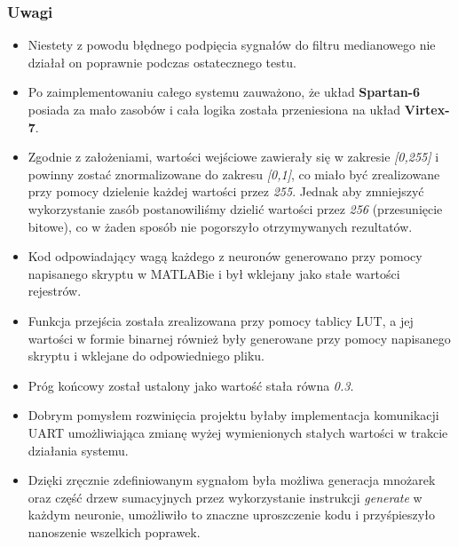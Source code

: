 \subsubsection{Uwagi} 
\begin{itemize}

\item Niestety z powodu błędnego podpięcia sygnałów do filtru medianowego nie działał on poprawnie podczas ostatecznego testu.
\item Po zaimplementowaniu całego systemu zauważono, że układ \textbf{Spartan-6} posiada za mało zasobów i cała logika została przeniesiona na układ \textbf{Virtex-7}.
\item Zgodnie z założeniami, wartości wejściowe zawierały się w zakresie \textit{[0,255]} i powinny zostać znormalizowane do zakresu\textit{ [0,1]}, co miało być zrealizowane przy pomocy dzielenie każdej wartości przez \textit{255}. Jednak aby zmniejszyć wykorzystanie zasób postanowiliśmy dzielić wartości przez \textit{256} (przesunięcie bitowe), co w żaden sposób nie pogorszyło otrzymywanych rezultatów.
\item Kod odpowiadający wagą każdego z neuronów generowano przy pomocy napisanego skryptu w MATLABie i był wklejany jako stałe wartości rejestrów. 
\item Funkcja przejścia została zrealizowana przy pomocy tablicy LUT, a jej wartości w formie binarnej również były generowane przy pomocy napisanego skryptu i wklejane do odpowiedniego pliku.
\item Próg końcowy został ustalony jako wartość stała równa \textit{0.3}.
\item Dobrym pomysłem rozwinięcia projektu byłaby implementacja komunikacji UART umożliwiająca zmianę wyżej wymienionych stałych wartości w trakcie działania systemu.
\item Dzięki zręcznie zdefiniowanym sygnałom była możliwa generacja mnożarek oraz część drzew sumacyjnych przez wykorzystanie instrukcji \textit{generate} w każdym neuronie, umożliwiło to znaczne uproszczenie kodu i przyśpieszyło nanoszenie wszelkich poprawek.

\end{itemize}
